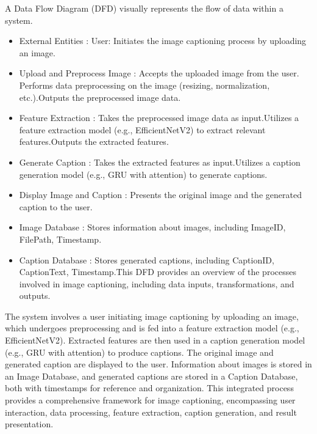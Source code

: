 \documentclass[oneside,a4paper,12pt]{report}
\begin{document}
A Data Flow Diagram (DFD) visually represents the flow of data within a system.\\
\begin{itemize}


\item{External Entities : }
User: Initiates the image captioning process by uploading an image.
\item{Upload and Preprocess Image : }
Accepts the uploaded image from the user.
Performs data preprocessing on the image (resizing, normalization, etc.).Outputs the preprocessed image data.
\item{Feature Extraction : }
Takes the preprocessed image data as input.Utilizes a feature extraction model (e.g., EfficientNetV2) to extract relevant features.Outputs the extracted features.
\item{Generate Caption : }
Takes the extracted features as input.Utilizes a caption generation model (e.g., GRU with attention) to generate captions.
\item {Display Image and Caption : }
Presents the original image and the generated caption to the user.

\item{Image Database : }
Stores information about images, including ImageID, FilePath, Timestamp.
\item{Caption Database : }
Stores generated captions, including CaptionID, CaptionText, Timestamp.This DFD provides an overview of the processes involved in image captioning, including data inputs, transformations, and outputs.

\end{itemize}
The system involves a user initiating image captioning by uploading an image, which undergoes preprocessing and is fed into a feature extraction model (e.g., EfficientNetV2). Extracted features are then used in a caption generation model (e.g., GRU with attention) to produce captions. The original image and generated caption are displayed to the user. Information about images is stored in an Image Database, and generated captions are stored in a Caption Database, both with timestamps for reference and organization. This integrated process provides a comprehensive framework for image captioning, encompassing user interaction, data processing, feature extraction, caption generation, and result presentation.
\end{document}
